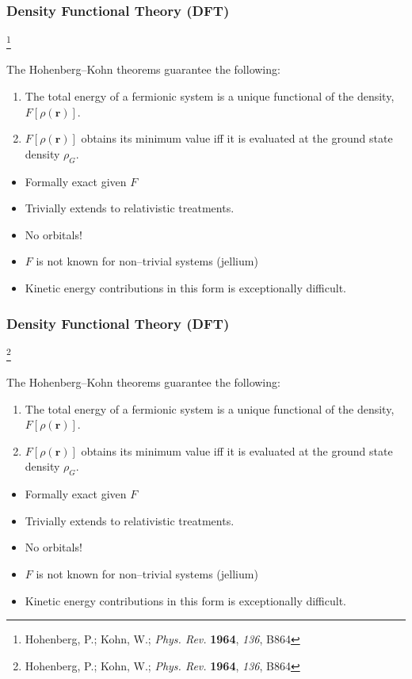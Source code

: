 \documentclass{beamer}
\newcommand\blfootnote[1]{%
  \begingroup
  \renewcommand\thefootnote{}\footnote{#1}%
  \addtocounter{footnote}{-1}%
  \endgroup
}
\begin{document}
\begin{frame}
\frametitle{Density Functional Theory (DFT)}
\blfootnote{Hohenberg, P.; Kohn, W.; \emph{Phys. Rev.} \textbf{1964}, \emph{136}, B864}

The Hohenberg--Kohn theorems guarantee the following:
\begin{enumerate}
  \item The total energy of a fermionic system is a unique functional of the density, $F[\rho(\mathbf{r})]$.
  \item $F[\rho(\mathbf{r})]$ obtains its minimum value iff it is evaluated at the ground state density $\rho_G$.
\end{enumerate}

\begin{itemize}
  \color{green}
  \item Formally exact given $F$
  \item Trivially extends to relativistic treatments.
  \item No orbitals!
\end{itemize}

\begin{itemize}
  \color{white}
  \item[\color{white}] $F$ is not known for non--trivial systems (jellium)
  \item[\color{white}] Kinetic energy contributions in this form is exceptionally difficult.
\end{itemize}

\end{frame}

\begin{frame}
\frametitle{Density Functional Theory (DFT)}
\blfootnote{Hohenberg, P.; Kohn, W.; \emph{Phys. Rev.} \textbf{1964}, \emph{136}, B864}

The Hohenberg--Kohn theorems guarantee the following:
\begin{enumerate}
  \item The total energy of a fermionic system is a unique functional of the density, $F[\rho(\mathbf{r})]$.
  \item $F[\rho(\mathbf{r})]$ obtains its minimum value iff it is evaluated at the ground state density $\rho_G$.
\end{enumerate}

\begin{itemize}
  \color{green}
  \item Formally exact given $F$
  \item Trivially extends to relativistic treatments.
  \item No orbitals!
\end{itemize}

\begin{itemize}
  \color{red}
  \item $F$ is not known for non--trivial systems (jellium)
  \color{white}
  \item[\color{white}] Kinetic energy contributions in this form is exceptionally difficult.
\end{itemize}

\end{frame}
\end{document}
